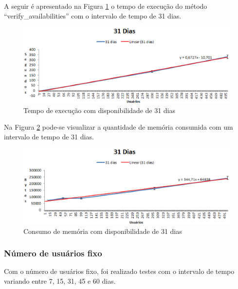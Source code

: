 A seguir é apresentado na Figura \ref{31dias_tempo} o tempo de execução do método ``verify\_availabilities'' com o intervalo de tempo de 31 dias.

\newpage

\begin{figure}[!h]
	\centering
	\includegraphics[scale=0.8]{figuras/resultados/graficos/31_dias_tempo.eps}
	\caption[Tempo de execução com disponibilidade de 31 dias]{Tempo de execução com disponibilidade de 31 dias}
	\label{31dias_tempo}
\end{figure}


Na Figura \ref{31dias_memoria} pode-se visualizar a quantidade de memória consumida com um intervalo de tempo de 31 dias.

\begin{figure}[!h]
	\centering
	\includegraphics[scale=0.8]{figuras/resultados/graficos/31_dias_memo.eps}
	\caption[Consumo de memória com disponibilidade de 31 dias]{Consumo de memória com disponibilidade de 31 dias}
	\label{31dias_memoria}
\end{figure}

\subsubsection{Número de usuários fixo}

Com o número de usuários fixo, foi realizado testes com o intervalo de tempo variando entre 7, 15, 31, 45 e 60 dias.

